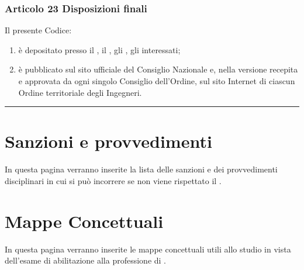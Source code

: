 \documentclass[letterpaper,10pt,italian]{sphinxmanual}
\begin{document}
\subsection{Articolo 23 \sphinxhyphen{} Disposizioni finali}
\label{\detokenize{capitoli/codice/codice_deontologico:articolo-23-disposizioni-finali}}\begin{description}
\sphinxAtStartPar
Il presente Codice:
\begin{enumerate}
%
\item {} 
\sphinxAtStartPar
è depositato presso il , il , gli , gli  interessati;

\item {} 
\sphinxAtStartPar
è pubblicato sul sito ufficiale del Consiglio Nazionale e, nella versione recepita e approvata da ogni singolo Consiglio dell’Ordine, sul sito Internet di ciascun Ordine territoriale degli Ingegneri.

\end{enumerate}

\end{description}


\bigskip\hrule\bigskip


\sphinxstepscope


\chapter{Sanzioni e provvedimenti}
\label{\detokenize{capitoli/sanzioni/sanzioni:sanzioni-e-provvedimenti}}\label{\detokenize{capitoli/sanzioni/sanzioni:sanzioni}}\label{\detokenize{capitoli/sanzioni/sanzioni::doc}}
\sphinxAtStartPar
In questa pagina verranno inserite la lista delle sanzioni e dei provvedimenti disciplinari in cui si può incorrere se non viene rispettato il {\hyperref[\detokenize{capitoli/codice/codice_deontologico:codice-deontologico}]{}}.

\sphinxAtStartPar
{}

\sphinxstepscope


\chapter{Mappe Concettuali}
\label{\detokenize{capitoli/mappe/mappe:mappe-concettuali}}\label{\detokenize{capitoli/mappe/mappe:id1}}\label{\detokenize{capitoli/mappe/mappe::doc}}
\sphinxAtStartPar
In questa pagina verranno inserite le mappe concettuali utili allo studio in vista dell’esame di abilitazione alla professione di .
\end{document}
